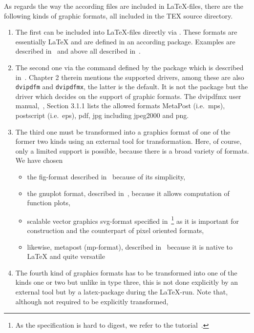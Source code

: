 As regards the way the according files are included in \LaTeX-files, 
there are the following kinds of graphic formats, 
all included in the TEX source directory. 
%
\begin{enumerate}
\item
The first can be included into \LaTeX-files directly via . 
These formats are essentially \LaTeX{}
and are defined in an according package. 
Examples are  described in~\cite{EEpic}
and above all  described in~\cite{TikzPGF23}. 
\item
The second one via the command  
defined by the package  
which is described in~\cite{GraX}. 
Chapter 2 therein mentions the supported drivers, 
among these are also \texttt{dvipdfm} and \texttt{dvipdfmx}, the latter is the default. 
It is not the package but the driver 
which decides on the support of graphic formats. 
The dvipdfmx user manual,~\cite{DviPdfMx}, Section 3.1.1 lists the allowed formats 
MetaPost (i.e.~\gls{mps}), postscript (i.e.~\gls{eps}), 
\gls{pdf}, \gls{jpg} including jpeg2000 and \gls{png}. 
\item\label{it:transExp}
The third one must be transformed into a graphics format 
of one of the former two kinds using an external tool for transformation. 
Here, of course, only a limited support is possible, 
because there is a broad variety of formats. 
We have chosen
%
\begin{itemize}
\item
  the \gls{fig}-format described in~\cite{XFigF}
  because of its simplicity, 
\item
  the gnuplot format, described in~\cite{GnuPlot6_0}, 
  because it allows computation of function plots, 
\item
  scalable vector graphics \gls{svg}-format specified in~\cite{Svg11}\footnote%
  { As the specification is hard to digest,
  we refer to the tutorial~\cite{SvgTut}. } 
  as it is important for construction and the counterpart of pixel oriented
  formats,
\item
  likewise, metapost (\gls{mp}-format),
  described in~\cite{MPost24} because it is native to \LaTeX{} 
  and quite versatile 
\end{itemize}
\item\label{it:transImp}
The fourth kind of graphics formats 
has to be transformed into one of the kinds one or two 
but unlike in type three, this is not done explicitly 
by an external tool but by a latex-package during the \LaTeX-run. 
Note that, although not required to be explicitly transformed, 

\end{enumerate}
